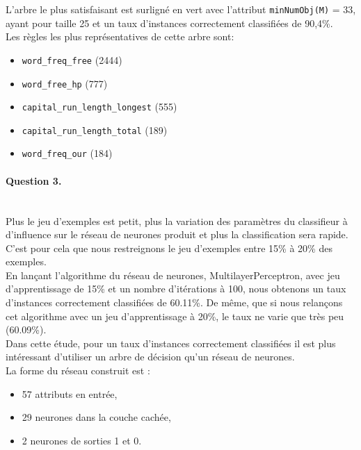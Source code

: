 \documentclass[a4paper,11pt]{article}
\begin{document}
L'arbre le plus \og{}satisfaisant\fg{} est surligné en vert avec l'attribut \texttt{minNumObj(M)} = 33, ayant pour taille 25 et un taux d'instances correctement classifiées de 90,4\%.\\

Les règles les plus représentatives de cette arbre sont:
\begin{itemize}
  \item \texttt{word\_freq\_free} (2444)
  \item \texttt{word\_free\_hp} (777)
  \item \texttt{capital\_run\_length\_longest} (555)
  \item \texttt{capital\_run\_length\_total} (189)
  \item \texttt{word\_freq\_our} (184)
\end{itemize}

\newpage
\paragraph{Question 3.} ~\\

Plus le jeu d'exemples est petit, plus la variation des paramètres du classifieur à d'influence sur le réseau de neurones produit et plus la classification sera rapide. C'est pour cela que nous restreignons le jeu d'exemples entre 15\% à 20\% des exemples.\\

	En lançant l'algorithme du réseau de neurones, \og{}MultilayerPerceptron\fg{}, avec jeu d'apprentissage de 15\% et 	un nombre d'itérations à 100, nous obtenons un taux d'instances correctement classifiées de 60.11\%. De même, que si nous relançons cet algorithme avec un jeu d'apprentissage à 20\%, le taux ne  varie que très peu (60.09\%).\\
	
	Dans cette étude, pour un taux d'instances correctement classifiées il est plus intéressant d'utiliser un arbre de décision qu'un réseau de neurones. \\

La forme du réseau construit est :
\begin{itemize}
  \item 57 attributs en entrée,
  \item 29 neurones dans la couche cachée,
  \item 2 neurones de sorties 1 et 0.
\end{itemize}
\end{document}
